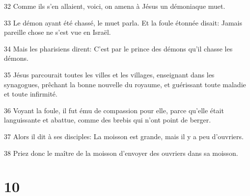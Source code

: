 \par 32 Comme ils s'en allaient, voici, on amena à Jésus un démoniaque muet.
\par 33 Le démon ayant été chassé, le muet parla. Et la foule étonnée disait: Jamais pareille chose ne s'est vue en Israël.
\par 34 Mais les pharisiens dirent: C'est par le prince des démons qu'il chasse les démons.
\par 35 Jésus parcourait toutes les villes et les villages, enseignant dans les synagogues, prêchant la bonne nouvelle du royaume, et guérissant toute maladie et toute infirmité.
\par 36 Voyant la foule, il fut ému de compassion pour elle, parce qu'elle était languissante et abattue, comme des brebis qui n'ont point de berger.
\par 37 Alors il dit à ses disciples: La moisson est grande, mais il y a peu d'ouvriers.
\par 38 Priez donc le maître de la moisson d'envoyer des ouvriers dans sa moisson.

\chapter{10}

